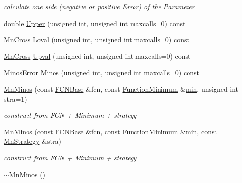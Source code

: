 \begin{DoxyCompactItemize}
\begin{DoxyCompactList}\small\item\em calculate one side (negative or positive Error) of the Parameter \end{DoxyCompactList}\item 
double \mbox{\hyperlink{classROOT_1_1Minuit2_1_1MnMinos_a387b76e3135998c519db7e6ae4cc3d90}{Upper}} (unsigned int, unsigned int maxcalls=0) const
\item 
\mbox{\hyperlink{classROOT_1_1Minuit2_1_1MnCross}{Mn\+Cross}} \mbox{\hyperlink{classROOT_1_1Minuit2_1_1MnMinos_a708381f90e4bd9118dec60726a1bdf73}{Loval}} (unsigned int, unsigned int maxcalls=0) const
\item 
\mbox{\hyperlink{classROOT_1_1Minuit2_1_1MnCross}{Mn\+Cross}} \mbox{\hyperlink{classROOT_1_1Minuit2_1_1MnMinos_a6fb073e7f84cb2d038714e362eda732a}{Upval}} (unsigned int, unsigned int maxcalls=0) const
\item 
\mbox{\hyperlink{classROOT_1_1Minuit2_1_1MinosError}{Minos\+Error}} \mbox{\hyperlink{classROOT_1_1Minuit2_1_1MnMinos_aeb1fe39f5851b5af050191d812d21723}{Minos}} (unsigned int, unsigned int maxcalls=0) const
\item 
\mbox{\hyperlink{classROOT_1_1Minuit2_1_1MnMinos_ac64ec75423efa6e473ee722f08f47eb4}{Mn\+Minos}} (const \mbox{\hyperlink{classROOT_1_1Minuit2_1_1FCNBase}{F\+C\+N\+Base}} \&fcn, const \mbox{\hyperlink{classROOT_1_1Minuit2_1_1FunctionMinimum}{Function\+Minimum}} \&\mbox{\hyperlink{adat__devel_2lib_2SU3_2SU3__internal_8h_ab0f5fed3171eb00d1c5f037d9f518a23}{min}}, unsigned int stra=1)
\begin{DoxyCompactList}\small\item\em construct from F\+CN + Minimum + strategy \end{DoxyCompactList}\item 
\mbox{\hyperlink{classROOT_1_1Minuit2_1_1MnMinos_a80f912ade0dd48d937bc04b14e28623c}{Mn\+Minos}} (const \mbox{\hyperlink{classROOT_1_1Minuit2_1_1FCNBase}{F\+C\+N\+Base}} \&fcn, const \mbox{\hyperlink{classROOT_1_1Minuit2_1_1FunctionMinimum}{Function\+Minimum}} \&\mbox{\hyperlink{adat__devel_2lib_2SU3_2SU3__internal_8h_ab0f5fed3171eb00d1c5f037d9f518a23}{min}}, const \mbox{\hyperlink{classROOT_1_1Minuit2_1_1MnStrategy}{Mn\+Strategy}} \&stra)
\begin{DoxyCompactList}\small\item\em construct from F\+CN + Minimum + strategy \end{DoxyCompactList}\item 
\mbox{\hyperlink{classROOT_1_1Minuit2_1_1MnMinos_a64625d0dd4308a7c8fb8930c980f11bd}{$\sim$\+Mn\+Minos}} ()

\end{DoxyCompactItemize}
